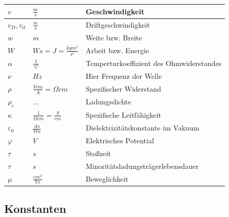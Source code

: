 \documentclass[12pt,a4paper]{article}%
\numberwithin{equation}{section}
\numberwithin{equation}{subsection}
\begin{document}
\begin{longtable} {|p{2cm}|p{3cm}|p{8.4cm}|}
	$v$ & $\frac{m}{s}$ & Geschwindigkeit \\ \hline
	$v_D, v_d$ & $\frac{m}{s}$ & Driftgeschwindigkeit \\ \hline
	$w$ & $m$ & Weite bzw. Breite  \\ \hline
	$W$ & $Ws = J = \frac{kgm^2}{s^2}$ & Arbeit bzw. Energie \\ \hline
	
	$\alpha$ & $\frac{1}{^{\circ} C}$ & Temperturkoeffizient des Ohmwiderstandes \\ \hline
	$\nu$ & $Hz$ & Hier Frequenz der Welle \\ \hline
	$\rho$ & $\frac{V cm}{A} = \Omega  cm$ & Spezifischer Widerstand \\ \hline
	$\rho_e$ & ... & Ladungsdichte \\ \hline
	$\kappa$ & $\frac{1}{\Omega cm} = \frac{S}{cm}$ & Spezifische Leitfähigkeit \\ \hline
	$\varepsilon_0$ & $\frac{As}{Vm}$ & Dielektrizitätskonstante im Vakuum \\ \hline
	$\varphi$ & $V$ & Elektrisches Potential \\ \hline
	$\tau$ & $s$ & Stoßzeit \\ \hline
	$\tau$ & $s$ & Minoritätsladungsträgerlebensdauer \\ \hline
	$\mu$ & $\frac{cm^2}{Vs}$ & Beweglichkeit \\ \hline
	\end{longtable}
	\renewcommand{\arraystretch}{1}
	
	\subsection{Konstanten} \label{ch:constants}
	\renewcommand{\arraystretch}{1.5}
	
\end{document}
